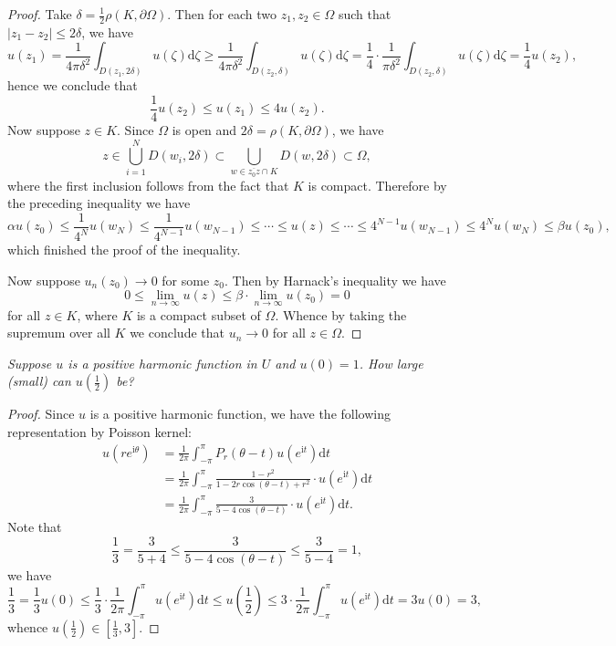 \begin{proof}
Take $\delta=\frac{1}{2}\rho(K,\partial\Omega)$. Then for each two $z_1,z_2\in\Omega$ such that $|z_1-z_2|\le 2\delta$, we have 
$$
u\left( z_1 \right) =\frac{1}{4\pi \delta ^2}\int_{D\left( z_1,2\delta \right)}{u\left( \zeta \right) \mathrm{d}\zeta}\ge \frac{1}{4\pi \delta ^2}\int_{D\left( z_2,\delta \right)}{u\left( \zeta \right) \mathrm{d}\zeta}=\frac{1}{4}\cdot \frac{1}{\pi \delta ^2}\int_{D\left( z_2,\delta \right)}{u\left( \zeta \right) \mathrm{d}\zeta}=\frac{1}{4}u\left( z_2 \right) ,
$$
hence we conclude that 
$$
\frac{1}{4}u\left( z_2 \right) \le u\left( z_1 \right) \le 4u\left( z_2 \right) .
$$
Now suppose $z\in K$. Since $\Omega$ is open and $2\delta=\rho(K,\partial\Omega)$, we have 
$$
z\in \bigcup_{i=1}^N{D\left( w_i,2\delta \right)}\subset \bigcup_{w\in \overline{z_0z}\cap K}{D\left( w,2\delta \right)}\subset \Omega ,
$$
where the first inclusion follows from the fact that $K$ is compact. Therefore by the preceding inequality we have 
$$
\alpha u\left( z_0 \right) \le \frac{1}{4^N}u\left( w_N \right) \le \frac{1}{4^{N-1}}u\left( w_{N-1} \right) \le \cdots \le u\left( z \right) \le \cdots \le 4^{N-1}u\left( w_{N-1} \right) \le 4^Nu\left( w_N \right) \le \beta u\left( z_0 \right) ,
$$
which finished the proof of the inequality.\par
Now suppose $u_n(z_0)\to 0$ for some $z_0$. Then by Harnack's inequality we have 
$$
0\le \lim_{n\rightarrow \infty} u\left( z \right) \le \beta \cdot \lim_{n\rightarrow \infty} u\left( z_0 \right) =0
$$
for all $z\in K$, where $K$ is a compact subset of $\Omega$. Whence by taking the supremum over all $K$ we conclude that $u_n\to 0$ for all $z\in\Omega$. 
\end{proof}
\begin{problem}\em
Suppose $u$ is a positive harmonic function in $U$ and $u(0)=1$. How large (small) can $u(\frac{1}{2})$ be?
\end{problem}
\begin{proof}
Since $u$ is a positive harmonic function, we have the following representation by Poisson kernel: 
$$
\begin{aligned}
u\left( re^{\mathrm{i}\theta} \right) &=\frac{1}{2\pi}\int_{-\pi}^{\pi}{P_r\left( \theta -t \right) u\left( e^{\mathrm{i}t} \right) \mathrm{d}t}
\\
&=\frac{1}{2\pi}\int_{-\pi}^{\pi}{\frac{1-r^2}{1-2r\cos \left( \theta -t \right) +r^2}\cdot u\left( e^{\mathrm{i}t} \right) \mathrm{d}t}
\\
&=\frac{1}{2\pi}\int_{-\pi}^{\pi}{\frac{3}{5-4\cos \left( \theta -t \right)}\cdot u\left( e^{\mathrm{i}t} \right) \mathrm{d}t}.
\end{aligned}
$$
Note that 
$$
\frac{1}{3}=\frac{3}{5+4}\le \frac{3}{5-4\cos \left( \theta -t \right)}\le \frac{3}{5-4}=1,
$$
we have 
$$
\frac{1}{3}=\frac{1}{3}u\left( 0 \right) \le \frac{1}{3}\cdot \frac{1}{2\pi}\int_{-\pi}^{\pi}{u\left( e^{\mathrm{i}t} \right) \mathrm{d}t}\le u\left( \frac{1}{2} \right) \le 3\cdot \frac{1}{2\pi}\int_{-\pi}^{\pi}{u\left( e^{\mathrm{i}t} \right) \mathrm{d}t}=3u\left( 0 \right) =3,
$$
whence $u(\frac{1}{2})\in[\frac{1}{3},3]$.
\end{proof}
